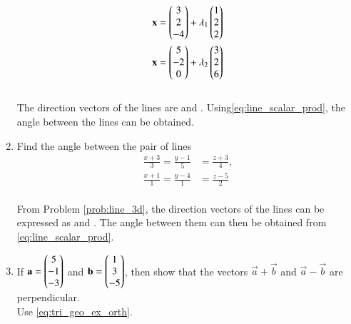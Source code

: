 \begin{enumerate}[label=\arabic*.,ref=\thesubsection.\theenumi]
\begin{align}
\mathbf{x} &= \begin{pmatrix}3\\2\\-4\end{pmatrix} + \lambda_1\begin{pmatrix}1 \\ 2 \\2\end{pmatrix}
\\
\mathbf{x} &= \begin{pmatrix}5\\-2\\0\end{pmatrix} + \lambda_2\begin{pmatrix}3 \\ 2 \\6\end{pmatrix}
\end{align}
%
\\
\solution The direction vectors of the lines are  and .   Using\eqref{eq:line_scalar_prod}, the angle between the lines can be obtained. 
\item Find the angle between the pair of lines
\begin{align}
\frac{x+3}{3} = \frac{y-1}{5} &= \frac{z+3}{4}, 
\\
\frac{x+1}{1} = \frac{y-4}{1} &= \frac{z-5}{2} 
\end{align}
%
\\
\solution From Problem \ref{prob:line_3d}, the direction vectors of the lines can be expressed as  and .  The angle between them can then be obtained from \eqref{eq:line_scalar_prod}.
%
\item If 
$\mathbf{a}=\begin{pmatrix}5\\-1\\-3\end{pmatrix}$
  and 
$\mathbf{b}=\begin{pmatrix}1\\3\\-5\end{pmatrix}$,
%
then show that the vectors $\vec{a}+\vec{b}$ and $\vec{a}-\vec{b}$ are perpendicular.
%
\\
\solution Use \eqref{eq:tri_geo_ex_orth}.
%


\end{enumerate}
